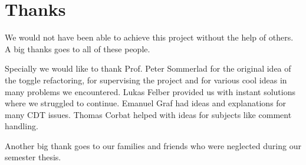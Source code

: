 \chapter*{Thanks}
We would not have been able to achieve this project without the help of others.
A big thanks goes to all of these people.

Specially we would like to thank Prof. Peter Sommerlad for the original idea
of the toggle refactoring, for supervising the project and for various cool
ideas in many problems we encountered. Lukas Felber provided us with
instant solutions where we struggled to continue. Emanuel Graf had ideas and
explanations for many CDT issues. Thomas Corbat helped with ideas for subjects
like comment handling.

Another big thank goes to our families and friends who were neglected during our
semester thesis.

\thispagestyle{empty}

